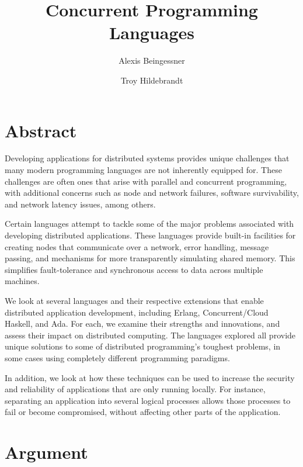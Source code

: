 \documentclass[10pt,a4paper]{article}
\begin{document}
\title{Concurrent Programming Languages}

\author{
Alexis Beingessner
\and
Troy Hildebrandt
}

\maketitle

\section{Abstract}

Developing applications for distributed systems provides unique challenges that many modern programming languages are not inherently equipped for. These challenges are often ones that arise with parallel and concurrent programming, with additional concerns such as node and network failures, software survivability, and network latency issues, among others.

Certain languages attempt to tackle some of the major problems associated with developing distributed applications. These languages provide built-in facilities for creating nodes that communicate over a network, error handling, message passing, and mechanisms for more transparently simulating shared memory. This simplifies fault-tolerance and synchronous access to data across multiple machines.

We look at several languages and their respective extensions that enable distributed application development, including Erlang, Concurrent/Cloud Haskell, and Ada. For each, we examine their strengths and innovations, and assess their impact on distributed computing. The languages explored all provide unique solutions to some of distributed programming's toughest problems, in some cases using completely different programming paradigms.

In addition, we look at how these techniques can be used to increase the security and reliability of applications that are only running locally. For instance, separating an application into several logical processes allows those processes to fail or become compromised, without affecting other parts of the application.

\section{Argument}
\end{document}
